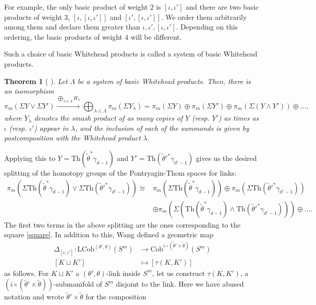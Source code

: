 \documentclass[a4paper, 11pt,reqno]{amsart}
\theoremstyle{plain}
\newtheorem{theorem}{Theorem}[section]
\theoremstyle{definition}
\newcommand{\Th}{\mathrm{Th}}
\begin{document}
For example, the only basic product of weight $2$ is $[\iota,\iota']$ and there are two basic products of weight $3$, $[\iota,[\iota,\iota']]$ and $[\iota',[\iota,\iota']]$. We order them arbitrarily among them and declare them greater than $\iota,\iota',[\iota,\iota']$. Depending on this ordering, the basic products of weight $4$ will be different.\par
Such a choice of basic Whitehead products is called a system of basic Whitehead products.
\begin{theorem}[{ \cite{hilton,milnor}}] Let $\Lambda$ be a system of basic Whitehead products. Then, there is an isomorphism
\begin{equation*} \pi_m(\Sigma Y\vee \Sigma Y') \xrightarrow{\bigoplus_{\lambda\in\Lambda}H_\lambda}\bigoplus_{\lambda\in\Lambda}\pi_m(\Sigma Y_\lambda)=\pi_m(\Sigma Y)\oplus\pi_m(\Sigma Y')\oplus\pi_m(\Sigma(Y\wedge Y'))\oplus\ldots,\end{equation*}
where $Y_\lambda$ denotes the smash product of as many copies of $Y$ (resp. $Y'$) as times as $\iota$ (resp. $\iota'$) appear in $\lambda$, and the inclusion of each of the summands is given by postcomposition with the Whitehead product $\lambda$.
\end{theorem}
Applying this to $Y=\Th(\widetilde{\theta}^\ast\gamma_{d-1})$ and $Y'=\Th(\widetilde{\theta}'^\ast\gamma_{d'-1})$ gives us the desired splitting of the homotopy groups of the Pontryagin-Thom spaces for links:
\begin{align*}
\pi_m(\Sigma \Th(\widetilde{\theta}^\ast\gamma_{d-1})\vee \Sigma \Th(\widetilde{\theta}'^\ast\gamma_{d'-1}))
\cong& \pi_m(\Sigma \Th(\widetilde{\theta}^\ast\gamma_{d-1})) \oplus\pi_m(\Sigma \Th(\widetilde{\theta}'^\ast\gamma_{d'-1}))\\
&  \oplus\pi_m(\Sigma(\Th(\widetilde{\theta}^\ast\gamma_{d-1})\wedge \Th(\widetilde{\theta}'^\ast\gamma_{d'-1})))\oplus\ldots.\end{align*}
The first two terms in the above splitting are the ones corresponding to the square  \eqref{square}. In addition to this, Wang \cite{geohilton,geohiltonthesis} defined a geometric map
\begin{align*}
\Delta_{[\iota,\iota']}\colon \mathrm{LCob}^{(\theta',\theta)}(S^m)&\to \mathrm{Cob}^{i\circ(\widetilde{\theta}'\times\widetilde{\theta})}(S^m) \\
[K\sqcup K']&\mapsto [\tau(K,K')]
\end{align*}
as follows. For $K\sqcup K'$ a $(\theta',\theta)$-link inside $S^m$, let us construct $\tau(K,K')$, a $\left(i\circ(\widetilde{\theta}'\times\widetilde{\theta})\right)$-submanifold of $S^m$ disjoint to the link. Here we have abused notation and wrote $\widetilde{\theta}'\times\widetilde{\theta}$ for the composition
\end{document}
